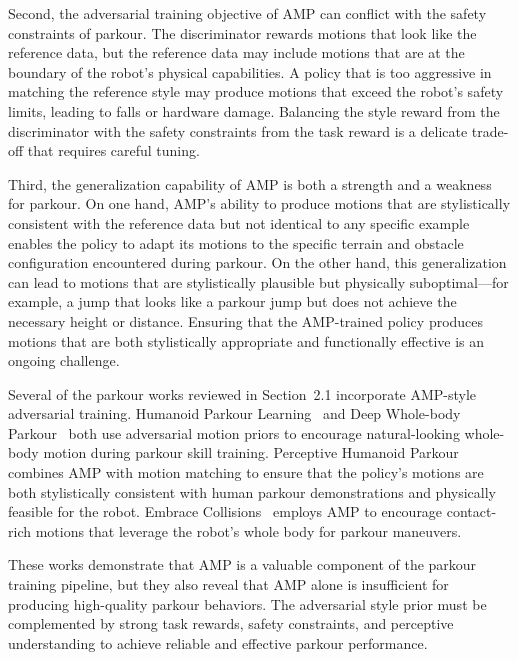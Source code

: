 Second, the adversarial training objective of AMP can conflict with the safety constraints of parkour. The discriminator rewards motions that look like the reference data, but the reference data may include motions that are at the boundary of the robot's physical capabilities. A policy that is too aggressive in matching the reference style may produce motions that exceed the robot's safety limits, leading to falls or hardware damage. Balancing the style reward from the discriminator with the safety constraints from the task reward is a delicate trade-off that requires careful tuning.

Third, the generalization capability of AMP is both a strength and a weakness for parkour. On one hand, AMP's ability to produce motions that are stylistically consistent with the reference data but not identical to any specific example enables the policy to adapt its motions to the specific terrain and obstacle configuration encountered during parkour. On the other hand, this generalization can lead to motions that are stylistically plausible but physically suboptimal---for example, a jump that looks like a parkour jump but does not achieve the necessary height or distance. Ensuring that the AMP-trained policy produces motions that are both stylistically appropriate and functionally effective is an ongoing challenge.

Several of the parkour works reviewed in Section~2.1 incorporate AMP-style adversarial training. Humanoid Parkour Learning~\cite{zhuang2024humanoidparkour} and Deep Whole-body Parkour~\cite{zhuang2024deepwholebody} both use adversarial motion priors to encourage natural-looking whole-body motion during parkour skill training. Perceptive Humanoid Parkour~\cite{wu2024perceptiveparkour} combines AMP with motion matching to ensure that the policy's motions are both stylistically consistent with human parkour demonstrations and physically feasible for the robot. Embrace Collisions~\cite{zhuang2024embrace} employs AMP to encourage contact-rich motions that leverage the robot's whole body for parkour maneuvers.

These works demonstrate that AMP is a valuable component of the parkour training pipeline, but they also reveal that AMP alone is insufficient for producing high-quality parkour behaviors. The adversarial style prior must be complemented by strong task rewards, safety constraints, and perceptive understanding to achieve reliable and effective parkour performance.

